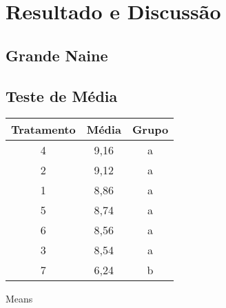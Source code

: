 \chapter{Resultado e Discussão}
\section{Grande Naine}

\section{Teste de Média}
  
 
 \begin{table}[htb]
 	\center
 	\footnotesize
	 	\begin{tabular}{|c|c|c|}
 		\hline
 		\textbf{Tratamento} & \textbf{Média}  & \textbf{Grupo}\\
 		\hline
 		4 & 9,16 & a \\
 		\hline
 		2 & 9,12 & a \\
		\hline
 		1 & 8,86 & a \\
		\hline
 		5 & 8,74 & a \\
		\hline
 		6 & 8,56  & a \\
		\hline
 		3 & 8,54  & a \\
		\hline
 		7 & 6,24   & b \\
		\hline
		
 	\end{tabular}
 \end{table}
  
  Means